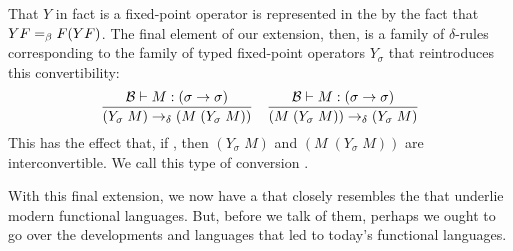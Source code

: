 That $Y$ in fact is a fixed-point operator is represented in the \lambdacalc by the fact that $Y F =_{\beta} F (Y F)$. The final element of our extension, then, is a family of $\delta$-rules corresponding to the family of typed fixed-point operators $Y_{\sigma}$ that reintroduces this convertibility:
\[
\frac{\basis \turnstile \stmt{M}{(\sigma \to \sigma)}}%
{(Y_{\sigma}\; M) \dred (M\; (Y_{\sigma}\; M))} 
\quad 
\frac{\basis \turnstile \stmt{M}{(\sigma \to \sigma)}}%
{(M\; (Y_{\sigma}\; M)) \dred (Y_{\sigma}\; M)}
\]
This has the effect that, if , then $(Y_{\sigma}\; M)$ and $(M\; (Y_{\sigma}\; M))$ are intercon\-vert\-i\-ble. We call this type of con\-ver\-sion .

With this final extension, we now have a \lambdacalc that closely resembles the \lambdacalcs that underlie modern functional languages. But, before we talk of them, perhaps we ought to go over the developments and languages that led to today's functional languages.
